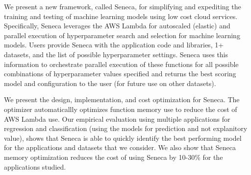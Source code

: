 
We present a new framework, called Seneca, for simplifying and expediting
the training and testing of machine learning models
using low cost cloud services.
Specifically, Seneca leverages the AWS Lambda for autoscaled
(elastic) and parallel execution of hyperparameter search 
and selection for machine learning models.  
Users provide Seneca with the application code and libraries, 1+ datasets, and the list 
of possible hyperparameter settings.  
Seneca uses this information to orchestrate parallel execution of these functions for all possible 
combinations of hyperparameter values specified and returns the best scoring model
and configuration to the user (for future use on other datasets).

We present the design, implementation, and cost optimization for Seneca.
The optimizer automaticallly optimizes function memory use to reduce the cost
of AWS Lambda use.  Our empirical evaluation using
multiple applications for regression and classification (using
the models for prediction and not explanitory value), shows that Seneca is able to quickly
identify the best performing model for the applications and datasets that we consider.  
We also show that Seneca memory optimization reduces the cost of using
Seneca by 10-30\% for the applications studied.


